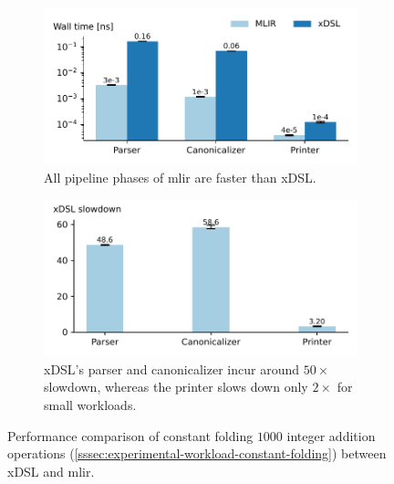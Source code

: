 \begin{figure}[H]
    \centering
    \begin{subfigure}[b]{0.45\textwidth}
        \includegraphics[width=\textwidth]{images/measuring_compiler_performance/walltimes.pdf}
        \caption{All pipeline phases of \ac{mlir} are faster than xDSL.}
        \vspace{1em}
        \label{fig:end-to-end-constant-folding-walltime}
    \end{subfigure}
    \hfill
    \begin{subfigure}[b]{0.45\textwidth}
        \includegraphics[width=\textwidth]{images/measuring_compiler_performance/speedup.pdf}
        \caption{xDSL's parser and canonicalizer incur around $50\times$ slowdown, whereas the printer slows down only $2\times$ for small workloads.}
        \label{fig:end-to-end-constant-folding-speedup}
    \end{subfigure}
    \caption{Performance comparison of constant folding $1000$ integer addition operations (\autoref{sssec:experimental-workload-constant-folding}) between xDSL and \ac{mlir}.}
    \label{fig:end-to-end-constant-folding}
\end{figure}


